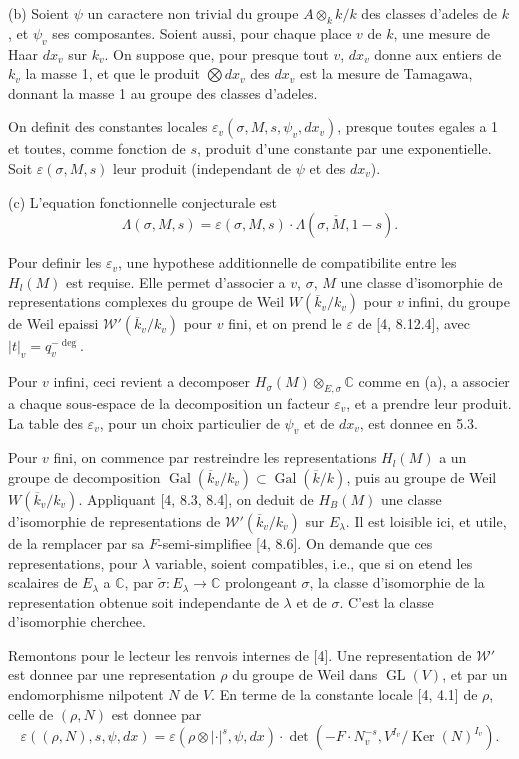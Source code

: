 \documentclass[12pt,a4paper]{article}
\theoremstyle{plain}
\theoremstyle{definition}
\theoremstyle{remark}
\DeclareMathOperator{\Gal}{Gal}
\DeclareMathOperator{\Ker}{Ker}
\DeclareMathOperator{\GL}{GL}
\newcommand{\C}{\mathbb{C}}
\begin{document}
(b) Soient $\psi$ un caractere non trivial du groupe $A \otimes_k k / k$ des classes d'adeles de
$k$, et $\psi_v$ ses composantes. Soient aussi, pour chaque place $v$ de $k$, une mesure de
Haar $dx_v$ sur $k_v$. On suppose que, pour presque tout $v$, $dx_v$ donne aux entiers de
$k_v$ la masse 1, et que le produit $\bigotimes dx_v$ des $dx_v$ est la mesure de Tamagawa, donnant
la masse 1 au groupe des classes d'adeles.

On definit des constantes locales $\varepsilon_v(\sigma, M, s, \psi_v, dx_v)$, presque toutes egales a 1 et
toutes, comme fonction de $s$, produit d'une constante par une exponentielle. Soit
$\varepsilon(\sigma, M, s)$ leur produit (independant de $\psi$ et des $dx_v$).

(c) L'equation fonctionnelle conjecturale est
\[
\Lambda(\sigma, M, s) = \varepsilon(\sigma, M, s) \cdot \Lambda(\sigma, \check{M}, 1-s).
\]

Pour definir les $\varepsilon_v$, une hypothese additionnelle de compatibilite entre les $H_l(M)$
est requise. Elle permet d'associer a $v$, $\sigma$, $M$ une classe d'isomorphie de representations
complexes du groupe de Weil $W(\overline{k}_v/k_v)$ pour $v$ infini, du groupe de Weil epaissi
$\mathcal{W}'(\overline{k}_v/k_v)$ pour $v$ fini, et on prend le $\varepsilon$ de [4, 8.12.4], avec $|t|_v = q_v^{-\deg}$.

Pour $v$ infini, ceci revient a decomposer $H_\sigma(M) \otimes_{E,\sigma} \C$ comme en (a), a associer
a chaque sous-espace de la decomposition un facteur $\varepsilon_v$, et a prendre leur produit.
La table des $\varepsilon_v$, pour un choix particulier de $\psi_v$ et de $dx_v$, est donnee en 5.3.

Pour $v$ fini, on commence par restreindre les representations $H_l(M)$ a un groupe de
decomposition $\Gal(\overline{k}_v/k_v) \subset \Gal(\overline{k}/k)$, puis au groupe de Weil $W(\overline{k}_v/k_v)$. Appliquant
[4, 8.3, 8.4], on deduit de $H_B(M)$ une classe d'isomorphie de representations de
$\mathcal{W}'(\overline{k}_v/k_v)$ sur $E_\lambda$. Il est loisible ici, et utile, de la remplacer par sa $F$-semi-simplifiee
[4, 8.6]. On demande que ces representations, pour $\lambda$ variable, soient compatibles,
i.e., que si on etend les scalaires de $E_\lambda$ a $\C$, par $\tilde{\sigma}: E_\lambda \to \C$ prolongeant $\sigma$,
la classe d'isomorphie de la representation obtenue soit independante de $\lambda$ et de $\sigma$.
C'est la classe d'isomorphie cherchee.

Remontons pour le lecteur les renvois internes de [4]. Une representation de $\mathcal{W}'$
est donnee par une representation $\rho$ du groupe de Weil dans $\GL(V)$, et par un
endomorphisme nilpotent $N$ de $V$. En terme de la constante locale [4, 4.1] de $\rho$,
celle de $(\rho, N)$ est donnee par
\[
\varepsilon((\rho, N), s, \psi, dx) = \varepsilon(\rho \otimes |\cdot|^s, \psi, dx) \cdot \det(-F \cdot N_v^{-s}, V^{I_v}/\Ker(N)^{I_v}).
\]
\end{document}
